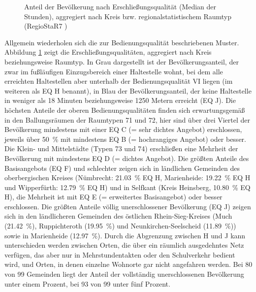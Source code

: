 \documentclass[11pt,pdftex,a4paper]{scrartcl}
\begin{document}
	\begin{figure}[!hb]
		\centering
		\caption[Einwohner je Erschließungsqualität]{Anteil der Bevölkerung nach Erschließungsqualität (Median der Stunden), aggregiert nach Kreis bzw. regionalstatistischem Raumtyp (RegioStaR7 \parencite{BMDVRegioStaR2026})}
		
		\label{fig:pop_eq_hour}
	\end{figure}
	Allgemein wiederholen sich die zur Bedienungsqualität beschriebenen Muster. Abbildung \ref{fig:pop_eq_hour} zeigt die Erschließungsqualitäten, aggregiert nach Kreis beziehungsweise Raumtyp. In Grau dargestellt ist der Bevölkerungsanteil, der zwar im fußläufigen Einzugsbereich einer Haltestelle wohnt, bei dem alle erreichten Haltestellen aber unterhalb der Bedienungsqualität VI liegen (im weiteren als EQ H benannt), in Blau der Bevölkerungsanteil, der keine Haltestelle in weniger als 18 Minuten beziehungsweise \num{1250} Metern erreicht (EQ J). Die höchsten Anteile der oberen Bedienungsqualitäten finden sich erwartungsgemäß in den Ballungsräumen der Raumtypen 71 und 72, hier sind über drei Viertel der Bevölkerung mindestens mit einer EQ C (= sehr dichtes Angebot) erschlossen, jeweils über \SI{50}{\percent} mit mindestens EQ B (= hochrangiges Angebot) oder besser. Die Klein- und Mittelstädte (Typen 73 und 74) erschließen eine Mehrheit der Bevölkerung mit mindestens EQ D (= dichtes Angebot). Die größten Anteile des Basisangebots (EQ F) und schlechter zeigen sich in ländlichen Gemeinden des oberbergischen Kreises (Nümbrecht: \SI{21.03}{\percent} EQ H, Marienheide: \SI{19.22}{\percent} EQ H und Wipperfürth: \SI{12.79}{\percent} EQ H) und in Selfkant (Kreis Heinsberg, \SI{ 10.80}{\percent} EQ H), die Mehrheit ist mit EQ E (= erweitertes Basisangebot) oder besser erschlossen. Die größten Anteile völlig unerschlossener Bevölkerung (EQ J) zeigen sich in den ländlicheren Gemeinden des östlichen Rhein-Sieg-Kreises (Much (\SI{21.42}{\percent}), Ruppichteroth (\SI{19.95}{\percent}) und Neunkirchen-Seelscheid (\SI{11.89}{\percent})) sowie in Marienheide (\SI{12.97}{\percent}). Durch die Abgrenzung zwischen H und J kann unterschieden werden zwischen Orten, die über ein räumlich ausgedehntes Netz verfügen, das aber nur in Mehrstundentakten oder den Schulverkehr bedient wird, und Orten, in denen einzelne Wohnorte gar nicht angefahren werden. Bei 80 von 99 Gemeinden liegt der Anteil der vollständig unerschlossenen Bevölkerung unter einem Prozent, bei 93 von 99 unter fünf Prozent.
	
\end{document}

